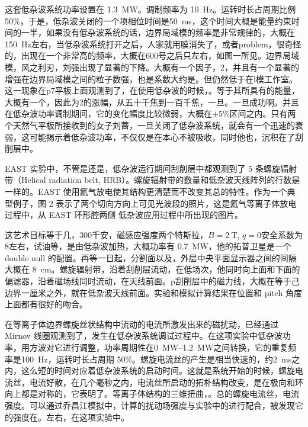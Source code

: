 这套低杂波系统功率设置在 \SI{1.3}{\mega\watt}。调制频率为 \SI{10}{\hertz}。运转时长占周期比例 50\%，于是，低杂波关闭的一个项相位时间是\SI{50}{\milli\second}，这个时间大概是能量约束时间的一半，如果没有低杂波系统的话，边界局域模的频率是非常规律的，大概在 \SI{150}{\hertz}左右，当低杂波系统打开之后，人家就用膜消失了，或者problem，很奇怪的，出现在一个非常高的频率，大概在600号之后只左右，如图一所见。边界局域模，风之利刃，刘强出现了显著的下降。大概有一个因子，2，并且有一个显著的增强在边界局域模之间的粒子数强，也是系数大约是。但仍然低于在l模工作室。这一现象在p7平板上面观测到了，在使用低杂波的时候，。等于其所具有的能量，大概有一个，因此为2的涨幅，从五十千焦到一百千焦，一旦\Hmode 。一旦\Hmode 成功啊。并且在低杂波功率调制期间，它的变化幅度比较微弱，大概在$\pm 5\%$区间之内。只有两个天然气平板所接收到的女子刘蔷，一旦关闭了低杂波系统，就会有一个迅速的衰弱，这可能揭示着低杂波功率，不仅仅是在本心不被吸收，同时他也，沉积在了刮削层中。

EAST 实验中，不管是\Lmode 还是\Hmode ，低杂波运行期间刮削层中都观测到了 5 条螺旋辐射带（Helical radiation belt, HRB）。螺旋辐射带的数量和低杂波天线阵列的行数是一样的。EAST 使用氦气放电使其结构更清楚而不改变其总的特性。作为一个典型例子，图 2 表示了两个切向方向上可见光波段的照片，这是氦气等离子体放电过程中，从 EAST 环形腔两侧 低杂波应用过程中所出现的图片。



这艺术目标等于几，300千安，磁感应强度两个特斯拉，$B=\SI{2}{\tesla}$, $q=0$安全系数为8左右，试油等，是由低杂波加热，大概功率有 \SI{0.7}{\mega\watt}，他的拓普卫星是一个 double null 的配置。再等一日起，分割面以及，外层中央平面显示器之间的间隔大概在 \SI{8}{\centi\metre}。螺旋辐射带，沿着刮削层流动，在低场次，他同时向上面和下面的偏滤器，沿着磁场线同时流动，在天线前面。p刮削层中的磁力线，大概在等于己边界一厘米之外，就在低杂波天线前面。实验和模拟计算结果在位置和 pitch 角度上面都有很好的吻合。


在等离子体边界螺旋丝状结构中流动的电流所激发出来的磁扰动，已经通过 Mirnov 线圈观测到了，发生在低杂波系统调试过程中。在这项实验中低杂波功率，用方波对它进行调整，功率周期性在\SIrange{0}{1.2}{\mega\watt}之间转换，它的重复频率是\SI{100}{\hertz}，运转时长占周期 50\%。螺旋电流丝的产生是相当快速的，约\SI{2}{\milli\second}之内，这么短的时间对应着低杂波系统的启动时间。这就是系统开始的时候，螺旋电流丝，电流好散，在几个毫秒之内，电流丝所启动的拓朴结构改变，是在极向和环向上都是对称的，它表明了。等离子体结构的三维扭曲，。总的螺旋电流丝，电流强度。可以通过乔昌江模拟中，计算的扰动场强度与实验中的进行配合，被发现它的强度在。左右，在这项实验中。


